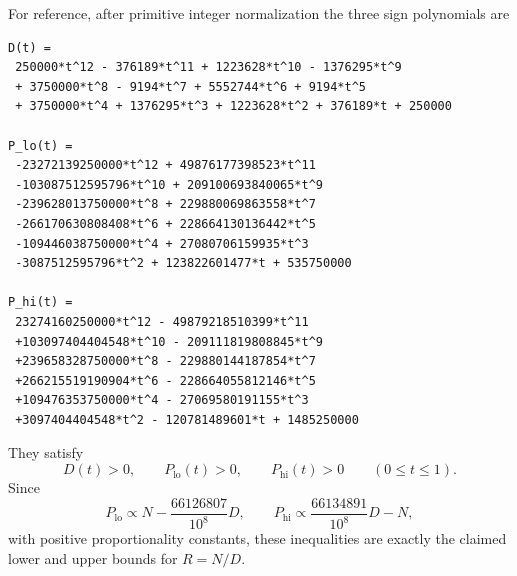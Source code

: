 \documentclass[11pt,oneside]{article}
\numberwithin{equation}{section}
\theoremstyle{definition}
\theoremstyle{remark}
\begin{document}
For reference, after primitive integer normalization the three sign polynomials are
\begin{lstlisting}[style=code]
D(t) =
 250000*t^12 - 376189*t^11 + 1223628*t^10 - 1376295*t^9
 + 3750000*t^8 - 9194*t^7 + 5552744*t^6 + 9194*t^5
 + 3750000*t^4 + 1376295*t^3 + 1223628*t^2 + 376189*t + 250000

P_lo(t) =
 -23272139250000*t^12 + 49876177398523*t^11
 -103087512595796*t^10 + 209100693840065*t^9
 -239628013750000*t^8 + 229880069863558*t^7
 -266170630808408*t^6 + 228664130136442*t^5
 -109446038750000*t^4 + 27080706159935*t^3
 -3087512595796*t^2 + 123822601477*t + 535750000

P_hi(t) =
 23274160250000*t^12 - 49879218510399*t^11
 +103097404404548*t^10 - 209111819808845*t^9
 +239658328750000*t^8 - 229880144187854*t^7
 +266215519190904*t^6 - 228664055812146*t^5
 +109476353750000*t^4 - 27069580191155*t^3
 +3097404404548*t^2 - 120781489601*t + 1485250000
\end{lstlisting}
They satisfy
\[
 D(t)>0,\qquad P_{\mathrm{lo}}(t)>0,
 \qquad P_{\mathrm{hi}}(t)>0
 \qquad(0\le t\le1).
\]
Since
\[
 P_{\mathrm{lo}}\propto N-\frac{66126807}{10^8}D,
 \qquad
 P_{\mathrm{hi}}\propto\frac{66134891}{10^8}D-N,
\]
with positive proportionality constants, these inequalities are exactly the claimed lower
and upper bounds for \(R=N/D\).
\end{document}
